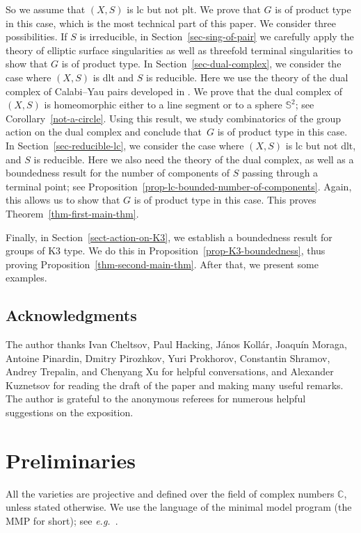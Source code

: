 \documentclass[11pt]{amsart}
\numberwithin{equation}{section}
\theoremstyle{definition}
\theoremstyle{remark}
\begin{document}
So we assume that $(X, S)$ is lc but not plt.  We prove that $G$ is of product type in this case, which is the most technical part of this paper.  We consider three possibilities.  If $S$ is irreducible, in Section~\ref{sec-sing-of-pair} we carefully apply the theory of elliptic surface singularities as well as threefold terminal singularities to show that $G$ is of product type.
In Section~\ref{sec-dual-complex}, we consider the case where $(X, S)$ is dlt and $S$ is reducible. Here we use the theory of the dual complex of Calabi--Yau pairs developed in \cite{KX16}. We prove that the dual complex of $(X, S)$ is homeomorphic either to a line segment or to a sphere $\mathbb{S}^2$; see Corollary~\ref{not-a-circle}. Using this result, we study combinatorics of the group action on the dual complex and conclude that~$G$ is of product type in this case. 
In Section~\ref{sec-reducible-lc}, we consider the case where $(X, S)$ is lc but not dlt, and $S$ is reducible. Here we also need the theory of the dual complex, as well as a boundedness result for the number of components of $S$ passing through a terminal point; see Proposition~\ref{prop-lc-bounded-number-of-components}. Again, this allows us to show that $G$ is of product type in this case. This proves Theorem~\ref{thm-first-main-thm}.

Finally, in Section~\ref{sect-action-on-K3}, we establish a boundedness result for groups of K3 type. We do this in Proposition~\ref{prop-K3-boundedness}, thus proving Proposition~\ref{thm-second-main-thm}. After that, we present some examples.

\subsection*{Acknowledgments}
The author thanks Ivan Cheltsov, Paul Hacking, J\'anos Koll\'ar, Joaqu\'in Moraga, Antoine Pinardin, Dmitry Pirozhkov, Yuri Prokhorov, Constantin Shramov, Andrey Trepalin, and Chenyang Xu for helpful conversations, and Alexander Kuznetsov for reading the draft of the paper and making many useful remarks.
The author is grateful to the anonymous referees for numerous helpful suggestions on the exposition. 

\section{Preliminaries}
 All the varieties are projective and defined over the field of complex numbers $\mathbb{C}$, unless stated otherwise. We use the language of the minimal model program (the MMP for short); see \textit{e.g.}~\cite{KM98}.
\end{document}
